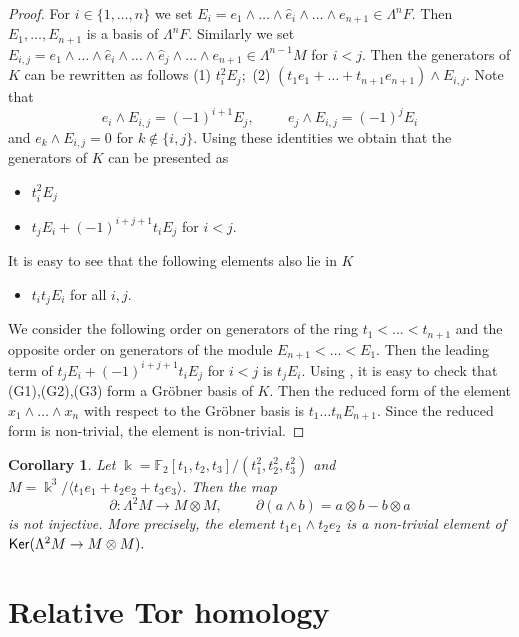 \documentclass{amsart}
\numberwithin{equation}{section}
\newtheorem{corollary}[theorem]{Corollary}
\theoremstyle{definition}
\def\kk{\Bbbk}
\begin{document}
\begin{proof}
For $i\in \{1,\dots,n\}$ we set $E_i=e_1 \wedge \dots \wedge \hat e_i \wedge \dots \wedge e_{n+1}\in \Lambda^n F.$ Then $E_1,\dots,E_{n+1}$ is a basis of $\Lambda^n F.$ Similarly we set $E_{i,j}=e_1 \wedge \dots \wedge \hat e_i \wedge \dots \wedge \hat e_j \wedge \dots \wedge e_{n+1} \in  \Lambda^{n-1} M$ for $i<j.$ Then the generators of $K$ can be rewritten as follows
(1) $t_i^2 E_j;$ 
(2) $(t_1e_1+\dots+t_{n+1}e_{n+1}) \wedge E_{i,j}.$ Note that 
$$e_i\wedge E_{i,j}=(-1)^{i+1} E_j, \hspace{1cm} e_j \wedge E_{i,j}=(-1)^jE_i $$
and $e_k \wedge E_{i,j}=0$ for $k\notin \{i,j\}.$ Using these identities we obtain that the generators of $K$ can be presented as
\begin{itemize}
\item[(G1)] $t_i^2E_j$
\item[(G2)] $t_jE_i+ (-1)^{i+j+1}t_iE_j$ for $i<j.$
\end{itemize}

It is easy to see that the following elements also lie in $K$
\begin{itemize}
\item[(G3)] $t_it_jE_i$ for all $i,j.$
\end{itemize}
We consider the following order on generators of the ring $t_1<\dots<t_{n+1}$ and the opposite order on generators of the module $E_{n+1}<\dots<E_1.$ Then  the leading term of $t_jE_i+ (-1)^{i+j+1}t_iE_j$ for $i<j$ is $t_jE_i.$
Using \cite[Theorem 3.5.19]{adams1994introduction}, it is easy to check that (G1),(G2),(G3) form a Gr\"obner basis of $K.$   Then the reduced form of the element $x_1\wedge \dots \wedge x_n$ with respect to the Gr\"obner basis is $t_1\dots t_n E_{n+1}.$ Since the reduced form is non-trivial, the element is non-trivial. 
\end{proof}

\begin{corollary}\label{cor_counter_kos}
Let $\kk=\mathbb F_2[t_1,t_2,t_3]/(t_1^2,t_2^2,t_3^2)$ and $M=\kk^3/\langle t_1e_1+t_2e_2+t_3e_3 \rangle.$
Then the map
$$\partial: \Lambda^2M\to M\otimes  M, \hspace{1cm} \partial(a\wedge b)=a\otimes b - b\otimes a$$
is not injective. More precisely, the element $t_1e_1\wedge t_2e_2$ is a non-trivial element of ${\sf Ker}(\Lambda^2M\to M\otimes  M).$
\end{corollary}



\section{Relative Tor homology}
\end{document}
